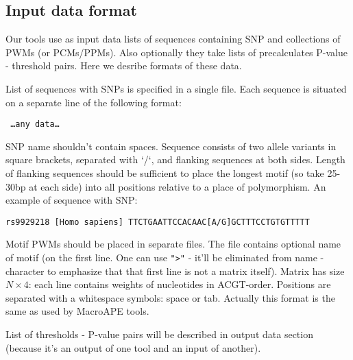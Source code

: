 \subsection{Input data format}
Our tools use as input data lists of sequences containing SNP and collections of PWMs (or PCMs/PPMs). Also optionally they take lists of precalculates P-value - threshold pairs. Here we desribe formats of these data.

List of sequences with SNPs is specified in a single file. Each sequence is situated on a separate line of the following format:

\texttt{ \dots any data\dots  {}}

SNP name shouldn't contain spaces. Sequence consists of two allele variants in square brackets, separated with `/`, and flanking sequences at both sides. Length of flanking sequences should be sufficient to place the longest motif (so take 25-30bp at each side) into all positions relative to a place of polymorphism. An example of sequence with SNP:

\texttt{rs9929218 [Homo sapiens] TTCTGAATTCCACAAC[A/G]GCTTTCCTGTGTTTTT}

Motif PWMs should be placed in separate files. The file contains optional name of motif (on the first line. One can use \texttt{"\textgreater"} - it'll be eliminated from name - character to emphasize that that first line is not a matrix itself). Matrix has size $N \times 4$: each line contains weights of nucleotides in ACGT-order. Positions are separated with a whitespace symbols: space or tab. Actually this format is the same as used by MacroAPE tools.

List of thresholds - P-value pairs will be described in output data section (because it's an output of one tool and an input of another).
